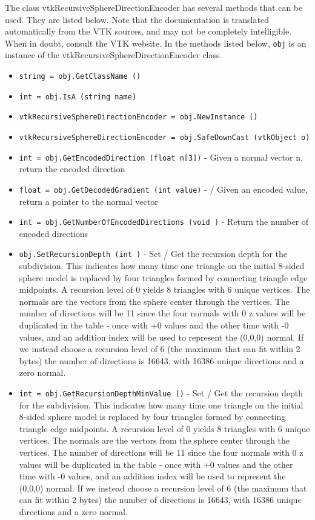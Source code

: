 The class vtkRecursiveSphereDirectionEncoder has several methods that can be used.
  They are listed below.
Note that the documentation is translated automatically from the VTK sources,
and may not be completely intelligible.  When in doubt, consult the VTK website.
In the methods listed below, \verb|obj| is an instance of the vtkRecursiveSphereDirectionEncoder class.
\begin{itemize}
\item  \verb|string = obj.GetClassName ()|

\item  \verb|int = obj.IsA (string name)|

\item  \verb|vtkRecursiveSphereDirectionEncoder = obj.NewInstance ()|

\item  \verb|vtkRecursiveSphereDirectionEncoder = obj.SafeDownCast (vtkObject o)|

\item  \verb|int = obj.GetEncodedDirection (float n[3])| -  Given a normal vector n, return the encoded direction  

\item  \verb|float = obj.GetDecodedGradient (int value)| - / Given an encoded value, return a pointer to the normal vector

\item  \verb|int = obj.GetNumberOfEncodedDirections (void )| -  Return the number of encoded directions

\item  \verb|obj.SetRecursionDepth (int )| -  Set / Get the recursion depth for the subdivision. This
 indicates how many time one triangle on the initial 8-sided
 sphere model is replaced by four triangles formed by connecting
 triangle edge midpoints. A recursion level of 0 yields 8 triangles
 with 6 unique vertices. The normals are the vectors from the
 sphere center through the vertices. The number of directions
 will be 11 since the four normals with 0 z values will be
 duplicated in the table - once with +0 values and the other
 time with -0 values, and an addition index will be used to
 represent the (0,0,0) normal. If we instead choose a recursion 
 level of 6 (the maximum that can fit within 2 bytes) the number
 of directions is 16643, with 16386 unique directions and a 
 zero normal.

\item  \verb|int = obj.GetRecursionDepthMinValue ()| -  Set / Get the recursion depth for the subdivision. This
 indicates how many time one triangle on the initial 8-sided
 sphere model is replaced by four triangles formed by connecting
 triangle edge midpoints. A recursion level of 0 yields 8 triangles
 with 6 unique vertices. The normals are the vectors from the
 sphere center through the vertices. The number of directions
 will be 11 since the four normals with 0 z values will be
 duplicated in the table - once with +0 values and the other
 time with -0 values, and an addition index will be used to
 represent the (0,0,0) normal. If we instead choose a recursion 
 level of 6 (the maximum that can fit within 2 bytes) the number
 of directions is 16643, with 16386 unique directions and a 
 zero normal.


\end{itemize}
